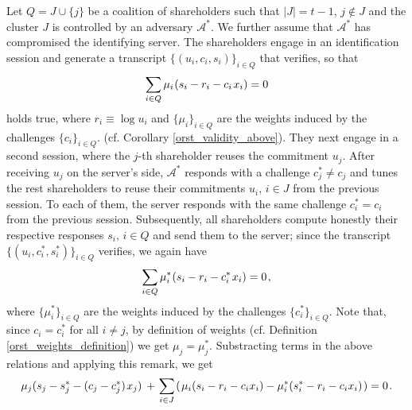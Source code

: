 \documentclass[psamsfonts, reqno]{amsart}
\theoremstyle{definition}
\theoremstyle{remark}
\numberwithin{equation}{section}
\begin{document}
Let $Q = J \cup \{j\}$ be a coalition of shareholders
such that $|J| = t-1$, $j \not \in J$
and the cluster $J$ is controlled by an adversary $\mathcal{A}^*$.
We further assume that $\mathcal{A}^*$
has compromised the identifying server.
The shareholders engage in an identification session
and generate a transcript $\{(u_i, c_i, s_i)\}_{i \in Q}$
that verifies, so that
\vspace{5pt}
\begin{equation*}
\sum_{i \in Q}
\mu_i\hspace{0.5pt} (s_i - r_i - c_i\hspace{1pt}x_i)
=
0
\vspace{5pt}
\end{equation*}
holds true,
where $r_i \equiv \log u_i$
and $\{\mu_i\}_{i \in Q}$ are the weights
induced by the challenges $\{c_i\}_{i \in Q}$.
(cf. Corollary \ref{orst_validity_above}).
They next engage in a second session,
where the $j$-th shareholder reuses the commitment $u_j$.
After receiving $u_j$ on the server's side,
$\mathcal{A}^*$ responds with a challenge $c_j^* \neq c_j$
and tunes the rest shareholders to
reuse their commitments $u_i,\hspace{2pt} i \in J$
from the previous session. To each of them,
the server responds with the same challenge
$c_i^* = c_i$
from the previous session.
Subsequently, all shareholders compute honestly their respective
responses $s_i,\hspace{2pt}i \in Q$
and send them to the server;
since the transcript $\{(u_i, c_i^*, s_i^*)\}_{i \in Q}$
verifies, we again have
\vspace{5pt}
\begin{equation*}
\sum_{i \in Q}
\mu_i^*\hspace{0.5pt} (s_i - r_i - c_i^*\hspace{1pt}x_i)
=
0\hspace{1pt},
\vspace{5pt}
\end{equation*}
where $\{\mu_i^*\}_{i \in Q}$ are the weights induced
by the challenges $\{c_i^*\}_{i \in Q}$.
Note that,
since $c_i = c_i^*$ for all $i \neq j$,
by definition of weights
(cf. Definition \ref{orst_weights_definition})
we get $\mu_j = \mu_j^*$.
Substracting terms in the above relations and applying this remark,
we get
\vspace{5pt}
\begin{equation*}
\mu_j (s_j - s_j^* - (c_j - c_j^*)\hspace{1pt} x_j)
\hspace{2pt}
+
\hspace{1pt}
\sum_{i \in J}\hspace{1pt}
(
\hspace{1pt}
\mu_i (s_i - r_i - c_i x_i)
-
\mu_i^* (s_i^* - r_i - c_i x_i)
\hspace{1pt}
)
=
0\hspace{1pt}.
\vspace{5pt}
\end{equation*}
\end{document}
